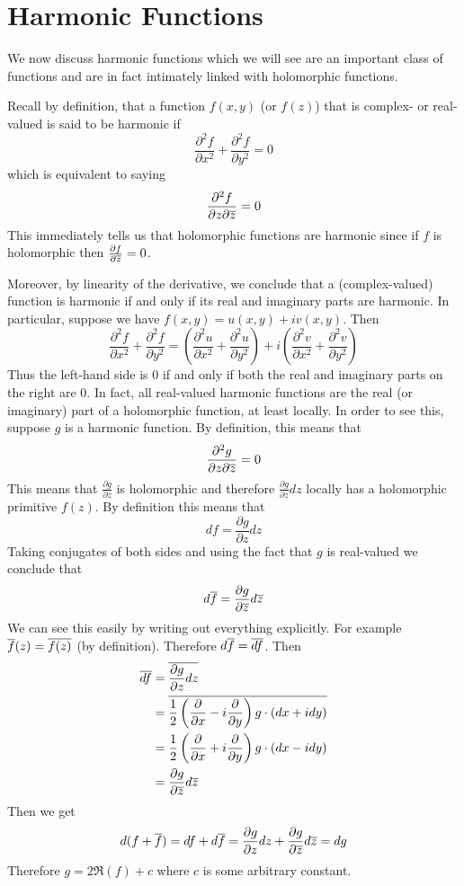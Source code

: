 \section{Harmonic Functions}
We now discuss harmonic functions which we will see are an important class of functions and are in fact intimately linked with holomorphic functions.

Recall by definition, that a function $f(x, y)$ (or $f(z)$) that is complex- or real-valued is said to be harmonic if
$$ \frac{\partial^2 f}{\partial x^2} + \frac{\partial^2 f}{\partial y^2} = 0 $$
which is equivalent to saying
$$ \frac{\partial^2 f}{\partial z \partial \overline{z}} = 0 $$
This immediately tells us that holomorphic functions are harmonic since if $f$ is holomorphic then $\frac{\partial f}{\partial \overline{z}} = 0$.

Moreover, by linearity of the derivative, we conclude that a (complex-valued) function is harmonic if and only if its real and imaginary parts are harmonic. In particular, suppose we have $f(x, y) = u(x, y) + iv(x, y)$. Then
$$ \frac{\partial^2 f}{\partial x^2} + \frac{\partial^2 f}{\partial y^2} = \left(\frac{\partial^2 u}{\partial x^2} + \frac{\partial^2 u}{\partial y^2} \right) + i\left(\frac{\partial^2 v}{\partial x^2} + \frac{\partial^2 v}{\partial y^2} \right) $$
Thus the left-hand side is 0 if and only if both the real and imaginary parts on the right are 0.
In fact, all real-valued harmonic functions are the real (or imaginary) part of a holomorphic function, at least locally. In order to see this, suppose $g$ is a harmonic function. By definition, this means that
$$\frac{\partial^2 g}{\partial z \partial \overline{z}} = 0$$
This means that $\frac{\partial g}{\partial z}$ is holomorphic and therefore $\frac{\partial g}{\partial z} dz$ locally has a holomorphic primitive $f(z)$. By definition this means that
$$df = \frac{\partial g}{\partial z} dz$$
Taking conjugates of both sides and using the fact that $g$ is real-valued we conclude that
$$d \overline{f} = \frac{\partial g}{\partial \overline{z}} d\overline{z}$$
We can see this easily by writing out everything explicitly. For example $\overline{f}(z) = \overline{f(z)}$ (by definition). Therefore $d\overline{f} = \overline{df}$. Then 
\begin{align*}
    \overline{df} &= \overline{\frac{\partial g}{\partial z} dz}\\
    &= \overline{\frac{1}{2} \left( \frac{\partial}{\partial x} - i \frac{\partial }{\partial y} \right)g \cdot (dx + idy)}\\
    &= \frac{1}{2} \left( \frac{\partial}{\partial x} + i \frac{\partial}{\partial y} \right)g \cdot (dx - idy)\\
    &= \frac{\partial g}{\partial \overline{z}} d \overline{z}
\end{align*}
Then we get
$$d(f + \overline{f}) = df + d \overline{f} = \frac{\partial g}{\partial z}dz + \frac{\partial g}{\partial \overline{z}} d\overline{z} = dg$$
Therefore $g = 2 \Re(f) + c$ where $c$ is some arbitrary constant.

